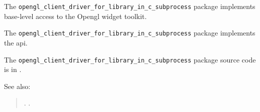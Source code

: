 
The {\tt opengl\_client\_driver\_for\_library\_in\_c\_subprocess} package implements base-level access to the Opengl widget 
toolkit.

The {\tt opengl\_client\_driver\_for\_library\_in\_c\_subprocess} package implements the  api.

The {\tt opengl\_client\_driver\_for\_library\_in\_c\_subprocess} package source code is in .

See also: 
\begin{quotation} 
.\newline 
{}.\newline 
\end{quotation} 


